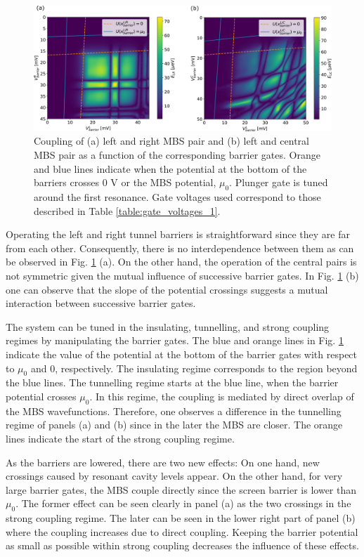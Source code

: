 \begin{figure}
\centering
  \includegraphics[width=\linewidth]{figures/device_1_barriers.pdf}
  \caption{Coupling of (a) left and right MBS pair and (b) left and central MBS pair as a function of the corresponding barrier gates. Orange and blue lines indicate when the potential at the bottom of the barriers crosses $0$ V or the MBS potential, $\mu_0$. Plunger gate is tuned around the first resonance. Gate voltages used correspond to those described in Table \ref{table:gate_voltages_1}.}
  \label{fig:device_1_barriers}
\end{figure}

Operating the left and right tunnel barriers is straightforward since they are far from each other.
Consequently, there is no interdependence between them as can be observed in Fig. \ref{fig:device_1_barriers} (a).
On the other hand, the operation of the central pairs is not symmetric given the mutual influence of successive barrier gates.
In Fig. \ref{fig:device_1_barriers} (b) one can observe that the slope of the potential crossings suggests a mutual interaction between successive barrier gates.

The system can be tuned in the insulating, tunnelling, and strong coupling regimes by manipulating the barrier gates.
The blue and orange lines in Fig. \ref{fig:device_1_barriers} indicate the value of the potential at the bottom of the barrier gates with respect to $\mu_0$ and $0$, respectively.
The insulating regime corresponds to the region beyond the blue lines.
The tunnelling regime starts at the blue line, when the barrier potential crosses $\mu_0$.
In this regime, the coupling is mediated by direct overlap of the MBS wavefunctions.
Therefore, one observes a difference in the tunnelling regime of panels (a) and (b) since in the later the MBS are closer.
The orange lines indicate the start of the strong coupling regime.

As the barriers are lowered, there are two new effects:
On one hand, new crossings caused by resonant cavity levels appear.
On the other hand, for very large barrier gates, the MBS couple directly since the screen barrier is lower than $\mu_0$.
The former effect can be seen clearly in panel (a) as the two crossings in the strong coupling regime.
The later can be seen in the lower right part of panel (b) where the coupling increases due to direct coupling.
Keeping the barrier potential as small as possible within strong coupling decreases the influence of these effects.

